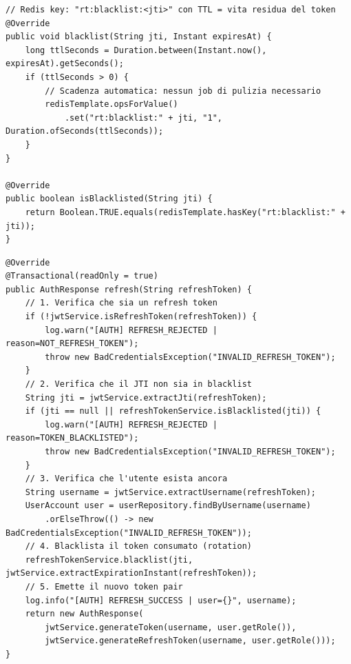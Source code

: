 ﻿\documentclass[a4paper,12pt]{report}
\begin{document}
\begin{securebox}[title={Codice Sicuro --- RefreshTokenServiceImpl.java (blacklist Redis)}]
\begin{lstlisting}[style=java]
// Redis key: "rt:blacklist:<jti>" con TTL = vita residua del token
@Override
public void blacklist(String jti, Instant expiresAt) {
    long ttlSeconds = Duration.between(Instant.now(), expiresAt).getSeconds();
    if (ttlSeconds > 0) {
        // Scadenza automatica: nessun job di pulizia necessario
        redisTemplate.opsForValue()
            .set("rt:blacklist:" + jti, "1", Duration.ofSeconds(ttlSeconds));
    }
}

@Override
public boolean isBlacklisted(String jti) {
    return Boolean.TRUE.equals(redisTemplate.hasKey("rt:blacklist:" + jti));
}
\end{lstlisting}
\end{securebox}

\begin{securebox}[title={Codice Sicuro --- AuthServiceImpl.java (refresh con rotation)}]
\begin{lstlisting}[style=java]
@Override
@Transactional(readOnly = true)
public AuthResponse refresh(String refreshToken) {
    // 1. Verifica che sia un refresh token
    if (!jwtService.isRefreshToken(refreshToken)) {
        log.warn("[AUTH] REFRESH_REJECTED | reason=NOT_REFRESH_TOKEN");
        throw new BadCredentialsException("INVALID_REFRESH_TOKEN");
    }
    // 2. Verifica che il JTI non sia in blacklist
    String jti = jwtService.extractJti(refreshToken);
    if (jti == null || refreshTokenService.isBlacklisted(jti)) {
        log.warn("[AUTH] REFRESH_REJECTED | reason=TOKEN_BLACKLISTED");
        throw new BadCredentialsException("INVALID_REFRESH_TOKEN");
    }
    // 3. Verifica che l'utente esista ancora
    String username = jwtService.extractUsername(refreshToken);
    UserAccount user = userRepository.findByUsername(username)
        .orElseThrow(() -> new BadCredentialsException("INVALID_REFRESH_TOKEN"));
    // 4. Blacklista il token consumato (rotation)
    refreshTokenService.blacklist(jti, jwtService.extractExpirationInstant(refreshToken));
    // 5. Emette il nuovo token pair
    log.info("[AUTH] REFRESH_SUCCESS | user={}", username);
    return new AuthResponse(
        jwtService.generateToken(username, user.getRole()),
        jwtService.generateRefreshToken(username, user.getRole()));
}
\end{lstlisting}
\end{securebox}
\end{document}

